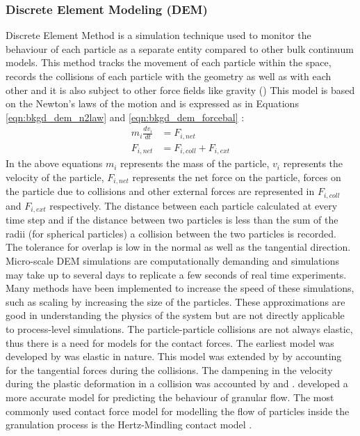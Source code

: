 \documentclass[preprint,11pt,authoryear]{elsarticle}
\begin{document}
\subsubsection{Discrete Element Modeling (DEM)}
 Discrete Element Method is a simulation technique used to monitor the behaviour of each particle 
as a separate entity compared to other bulk continuum models. This method tracks the movement of 
each particle within the space, records the collisions of each particle with the geometry as well 
as with each other and it is also subject to other force fields like gravity (\cite{Barrasso2015cerd})  This 
model is based on the Newton's laws of the motion and is expressed as in Equations 
\ref{eqn:bkgd_dem_n2law} and  \ref{eqn:bkgd_dem_forcebal} : \\
\begin{align}
m_i\frac{dv_i}{dt} &= F_{i,net} \label{eqn:bkgd_dem_n2law} \\
F_{i,net} &=  F_{i,coll} +  F_{i,ext} \label{eqn:bkgd_dem_forcebal}
\end{align}
  In the above equations $m_i$ represents the mass of the particle, $v_i$ represents the velocity of 
the particle, $F_{i,net}$  represents the net force on the particle, forces on the particle due to collisions 
and other external forces are represented in $F_{i,coll}$ and $F_{i,ext}$ respectively.
 The distance between each particle calculated at every time step and if the distance between two 
particles is less than the sum of the radii (for spherical particles)  a collision between the two particles 
is recorded. The tolerance for overlap is low in the normal as well as the tangential direction. 
Micro-scale DEM simulations are computationally demanding and simulations may take up to several 
days to replicate a few seconds of real time experiments. Many methods have been implemented to 
increase the speed of these simulations, such as scaling by increasing the size of the particles. These 
approximations are good in understanding the physics of the system but are not directly applicable to 
process-level simulations. 
The particle-particle collisions are not always elastic, thus there is a need for models for the 
contact forces. The earliest model was developed by \cite{hertz1882} was elastic in nature. This model was 
extended by \cite{mindlin1953} by accounting for the  tangential forces during the collisions. The dampening
in the velocity during the plastic deformation in a collision was accounted by \cite{Cundall1979} and 
\cite{walton1986}. \cite{tsuji1992} developed a more accurate model for predicting the behaviour of granular flow.
The most commonly used contact force model for modelling the flow of particles inside the granulation process 
is the Hertz-Mindling contact model \citep{gantt2006}\citep{hassanpour2013}. 
 
\end{document}
